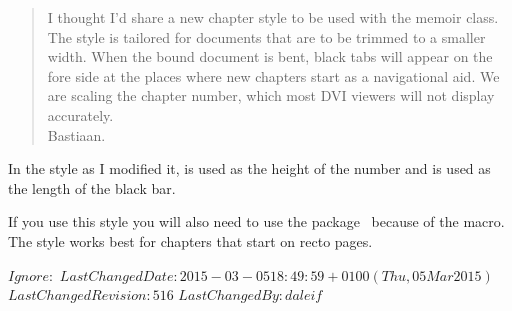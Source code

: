 \begin{quote}
 I thought I'd share a new chapter style to be used with the memoir class. 
 The style is tailored for documents that are to be trimmed to a smaller 
 width. When the bound document is bent, black tabs will appear on the 
 fore side at the places where new chapters start as a navigational aid.
 We are scaling the chapter number, which most DVI viewers
 will not display accurately. \\[0.5\onelineskip]
Bastiaan.
\end{quote}

    In the style as I modified it, \lnc{\beforechapskip} is used as the 
height of the number and \lnc{\midchapskip} is used as the length of the
black bar.
\begin{lcode}
\newlength{\numberheight}
\newlength{\barlength}
\end{lcode}


    If you use this style you will also need to use the  
package~\cite{GRAPHICX} because of the \cmd{\resizebox} macro. 
The  style works best for chapters that start 
on recto pages.


\endgroup




\svnidlong
{$Ignore: $}
{$LastChangedDate: 2015-03-05 18:49:59 +0100 (Thu, 05 Mar 2015) $}
{$LastChangedRevision: 516 $}
{$LastChangedBy: daleif $}


